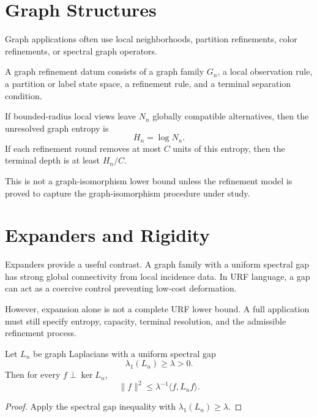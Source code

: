 \section{Graph Structures}

Graph applications often use local neighborhoods, partition refinements, color
refinements, or spectral graph operators.

\begin{definition}
A graph refinement datum consists of a graph family \(G_n\), a local
observation rule, a partition or label state space, a refinement rule, and a
terminal separation condition.
\end{definition}

If bounded-radius local views leave \(N_n\) globally compatible alternatives,
then the unresolved graph entropy is
\[
H_n=\log N_n.
\]
If each refinement round removes at most \(C\) units of this entropy, then the
terminal depth is at least \(H_n/C\).

\begin{remark}
This is not a graph-isomorphism lower bound unless the refinement model is
proved to capture the graph-isomorphism procedure under study.
\end{remark}

\section{Expanders and Rigidity}

Expanders provide a useful contrast. A graph family with a uniform spectral
gap has strong global connectivity from local incidence data. In URF language,
a gap can act as a coercive control preventing low-cost deformation.

However, expansion alone is not a complete URF lower bound. A full application
must still specify entropy, capacity, terminal resolution, and the admissible
refinement process.

\begin{theorem}
Let \(L_n\) be graph Laplacians with a uniform spectral gap
\[
\lambda_1(L_n)\ge \lambda>0.
\]
Then for every \(f\perp\ker L_n\),
\[
\|f\|^2\le \lambda^{-1}\langle f,{L_n}f\rangle.
\]
\end{theorem}

\begin{proof}
Apply the spectral gap inequality with \(\lambda_1(L_n)\ge\lambda\).
\end{proof}

